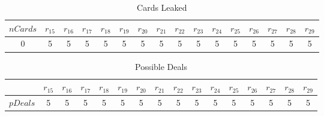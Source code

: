 \begin{table}[ht] 
\begin{tabular}{ | c || c | c | c | c | c | c | c | c | c | c | c | c | c | c | c  | } 
 \hline 
$nCards$  & $r_{15}$ & $r_{16}$ & $r_{17}$ & $r_{18}$ & $r_{19}$ & $r_{20}$ & $r_{21}$ 
& $r_{22}$ & $r_{23}$ & $r_{24}$ & $r_{25}$ & $r_{26}$ & $r_{27}$ & $r_{28}$ & $r_{29}$ \\ 
 \hline 
0 & 5 & 5 & 5 & 5 & 5 & 5 & 5 & 5 & 5 & 5 & 5 & 5 & 5 & 5 & 5 \\ 
\hline
\end{tabular}
\caption{Cards Leaked}
\label{cLeaked-1}
\end{table}

\begin{table}[ht] 
\begin{tabular}{ | c || c | c | c | c | c | c | c | c | c | c | c | c | c | c | c  | } 
\hline
$\;$  & $r_{15}$ & $r_{16}$ & $r_{17}$ & $r_{18}$ & $r_{19}$ & $r_{20}$ & $r_{21}$ 
& $r_{22}$ & $r_{23}$ & $r_{24}$ & $r_{25}$ & $r_{26}$ & $r_{27}$ & $r_{28}$ & $r_{29}$ \\ 
\hline 
$pDeals$ & 5  & 5  & 5  & 5  & 5  & 5  & 5  & 5  & 5  & 5  & 5  & 5  & 5  & 5  & 5  \\ 
\hline 
\end{tabular}
\caption{Possible Deals}
\label{pDeals-1}
\end{table}





